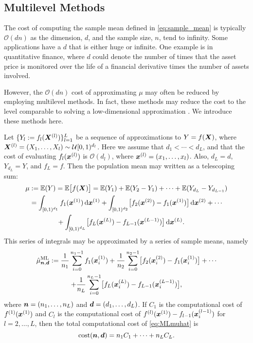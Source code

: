 \documentclass{svproc}
\begin{document}
\subsection{Multilevel Methods} \label{sec:multi}
The cost of computing the sample mean defined in \eqref{eq:sample_mean} is typically $\mathcal{O}(dn)$ as the dimension, $d$, and the sample size, $n$, tend to infinity.  Some applications have a $d$ that is either huge or infinite.  One example is in quantitative finance, where $d$ could denote the number of times that the asset price is monitored over the life of a financial derivative times the number of assets involved.  

However, the $\mathcal{O}(dn)$ cost of approximating $\mu$ may often be reduced by employing multilevel methods.  In fact, these methods may reduce the cost to the level comparable to solving a low-dimensional approximation \cite{Gil15a}. We introduce these methods here.

Let $\{Y_l := f_l({\boldsymbol{X}}^{(l)})\}_{l=1}^L$ be a sequence of approximations to $Y = f({\boldsymbol{X}})$, where ${\boldsymbol{X}}^{(l)} = (X_1, \ldots, X_l) \sim \mathcal{U}[0,1)^{d_l}$.  Here we assume that $d_1 < \cdots < d_L$, and that the cost of evaluating $f_l({\boldsymbol{x}}^{(l)})$ is $\mathcal{O}(d_l)$, where ${\boldsymbol{x}}^{(l)} = (x_1, \ldots, x_l)$.  Also, $d_L = d$, $Y_{d_L} = Y$, and $f_L = f$. Then the population mean may written as a telescoping sum:
\begin{align*}
    \mu & := \mathbb{E}(Y) = \mathbb{E}\bigl[f({\boldsymbol{X}})\bigr]
    = \mathbb{E}(Y_1) + \mathbb{E}(Y_2 - Y_1) + \cdots + \mathbb{E}(Y_{d_L} - Y_{d_{L-1}}) \\
    & = \int_{[0,1)^{d_1}} f_1({\boldsymbol{x}}^{(1)}) \, \mathrm{d} {\boldsymbol{x}}^{(1)} +  \int_{[0,1)^{d_2}} \bigl[f_2({\boldsymbol{x}}^{(2)}) - f_1({\boldsymbol{x}}^{(1)})\bigr] \, \mathrm{d} {\boldsymbol{x}}^{(2)} + \cdots \\
    & \qquad \qquad + \int_{[0,1)^{d_L}} \bigl[f_L({\boldsymbol{x}}^{(L)}) - f_{L-1}({\boldsymbol{x}}^{(L-1)}) \bigr] \, \mathrm{d} {\boldsymbol{x}}^{(L)}.
\end{align*}
This series of integrals may be approximated by a series of sample means, namely
\begin{multline} \label{eq:MLmuhat}
    \hat{\mu}^{\text{ML}}_{{\boldsymbol{n}},{\boldsymbol{d}}}  := \frac{1}{n_1}  \sum_{i=0}^{n_1-1} f_1({\boldsymbol{x}}^{(1)}_i)  +  \frac{1}{n_2}  \sum_{i=0}^{n_2-1}  \bigl[f_2({\boldsymbol{x}}^{(2)}_i) - f_1({\boldsymbol{x}}^{(1)}_i)\bigr] + \cdots \\
     + \frac{1}{n_L}  \sum_{i=0}^{n_L-1}  \bigl[f_L({\boldsymbol{x}}_i^{(L)}) - f_{L-1}({\boldsymbol{x}}_i^{(L-1)}) \bigr],
\end{multline}
where ${\boldsymbol{n}} = (n_1, \ldots, n_L)$ and ${\boldsymbol{d}} = (d_1, \ldots, d_L)$. 
If $C_1$ is the computational cost of $f^{(1)}({\boldsymbol{x}}^{(1)})$ and $C_l$ is the computational cost of $f^{(l)}({\boldsymbol{x}}^{(1)}) - f_{l-1}({\boldsymbol{x}}_i^{(l-1)})$ for $l = 2, \ldots, L$, then the total computational cost of 
\eqref{eq:MLmuhat} is 
\begin{equation} \label{eq:MLcostdef}
    \text{cost}({\boldsymbol{n}},{\boldsymbol{d}}) = n_1 C_1 + \cdots + n_L C_L.
\end{equation}
\end{document}
